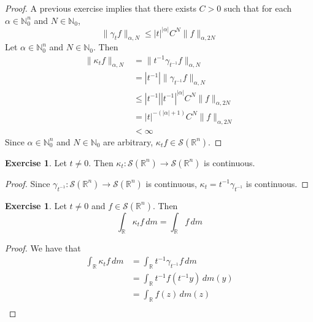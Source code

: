 \documentclass{book}
\theoremstyle{definition}
\newtheorem{ex}[definition]{Exercise}
\newcommand{\al}{\alpha}
\newcommand{\gam}{\gamma}
\newcommand{\kap}{\kappa}
\newcommand{\N}{\mathbb{N}}
\newcommand{\R}{\mathbb{R}}
\newcommand{\MS}{\mathcal{S}}
\DeclareMathOperator*{\0}{\mbf{0}}
\DeclareMathOperator*{\1}{\mbf{1}}
\newcommand{\dm}{\, d m}
\begin{document}
	\begin{proof}
		A previous exercise implies that there exists $C > 0$ such that for each $\al \in \N_0^n$ and $N \in \N_0$, 
		$$\| \gam_t f\|_{\al, N} \leq |t|^{|\al|} C^N\|f\|_{\al, 2N}$$
		Let $\al \in \N_0^n$ and $N \in \N_0$. Then
		\begin{align*}
			\|\kap_t f\|_{\al, N}
			& = \|t^{-1} \gam_{t^{-1}} f \|_{\al, N} \\
			& = |t^{-1}| \|\gam_{t^{-1}} f \|_{\al, N} \\
			& \leq |t^{-1}| |t^{-1}|^{|\al|} C^N\|f\|_{\al, 2N} \\
			& = |t|^{-(|\al| + 1)} C^N \|f\|_{\al, 2N} \\
			& < \infty 
		\end{align*}
		Since $\al \in \N_0^n$ and $N \in \N_0$ are arbitrary, $\kap_t f \in \MS(\R^n)$.
	\end{proof}
	
	\begin{ex}
		Let $t \neq 0$. Then $\kap_t: \MS(\R^n) \rightarrow \MS(\R^n)$ is continuous.
	\end{ex}
	
	\begin{proof} 
	Since $\gam_{t^{-1}}: \MS(\R^n) \rightarrow \MS(\R^n)$ is continuous, $\kap_t = t^{-1} \gam_{t^{-1}}$ is continuous.
	\end{proof}


		\begin{ex}
		Let $t \neq 0$ and $f \in \MS(\R^n)$. Then 
		$$\int_{\R} \kap_t f \dm  = \int_{\R} f \dm$$
	\end{ex}
	
	\begin{proof}
		We have that 
		\begin{align*}
			\int_{\R} \kap_t f \dm
			& = \int_{\R} t^{-1} \gam_{t^{-1}} f \dm \\
			& = \int_{\R} t^{-1} f(t^{-1} y) \dm(y) \\
			& = \int_{\R}  f(z) \dm(z) \\
		\end{align*}
	\end{proof}
\end{document}
